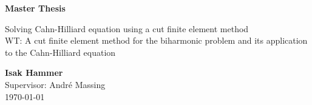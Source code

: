 \documentclass[11pt]{article}
\begin{document}
\begin{titlepage}
    \begin{center}
        \vspace*{1cm}

        \Huge
        \textbf{Master Thesis}

        \vspace{0.5cm}
        \Large
        Solving Cahn-Hilliard equation using a cut finite element method   \\
        WT: A cut finite element method for the biharmonic problem and
        its application to the Cahn-Hilliard equation

        \vspace{1.5cm}

        \textbf{Isak Hammer} \\
        \vspace{0.5cm}
        Supervisor: André Massing \\
        \vspace{0.5cm}
        \today


        \vfill

        \vspace{0.8cm}


\end{center}
\end{titlepage}
\end{document}
